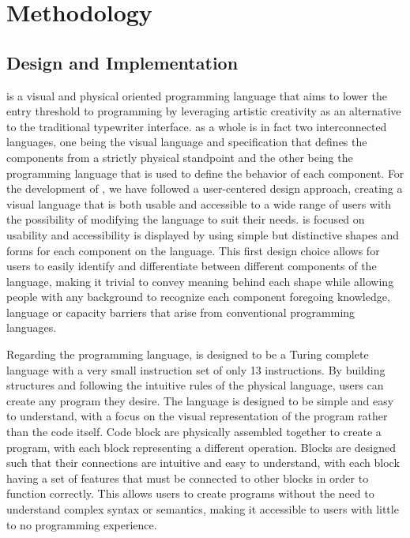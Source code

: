 \section{Methodology}
\label{sec:methodology}

\subsection{Design and Implementation}
\sculpt is a visual and physical oriented programming language that aims to lower the entry threshold to programming by leveraging artistic creativity as an alternative to the traditional typewriter interface.
\sculpt as a whole is in fact two interconnected languages, one being the visual language and specification that defines the components from a strictly physical standpoint and the other being the programming language that is used to define the behavior of each component.
For the development of \sculpt, we have followed a user-centered design approach, creating a visual language that is both usable and accessible to a wide range of users with the possibility of modifying the language to suit their needs.
\sculpt is focused on usability and accessibility is displayed by using simple but distinctive shapes and forms for each component on the language.
This first design choice allows for users to easily identify and differentiate between different components of the language, making it trivial to convey meaning behind each shape while allowing people with any background to recognize each component foregoing knowledge, language or capacity barriers that arise from conventional programming languages.

Regarding the programming language, \sculpt is designed to be a Turing complete language with a very small instruction set of only 13 instructions.
By building structures and following the intuitive rules of the physical language, users can create any program they desire.
The language is designed to be simple and easy to understand, with a focus on the visual representation of the program rather than the code itself.
Code block are physically assembled together to create a program, with each block representing a different operation. Blocks are designed such that their connections are intuitive and easy to understand, with each block having a set of features that must be connected to other blocks in order to function correctly.
This allows users to create programs without the need to understand complex syntax or semantics, making it accessible to users with little to no programming experience.


